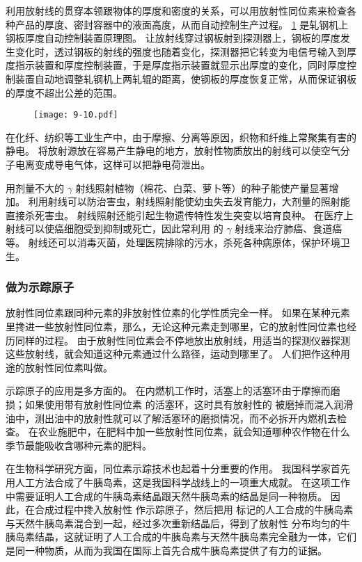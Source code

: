 利用放射线的贯穿本领跟物体的厚度和密度的关系，可以用放射性同位素来检查各种产品的厚度、密封容器中的液面高度，从而自动控制生产过程。
\cref{fig:9-10} 是轧钢机上钢板厚度自动控制装置原理图。
让放射线穿过钢板射到探测器上，钢板的厚度发生变化时，透过钢板的射线的强度也随着变化，探测器把它转变为电信号输入到厚度指示装置和厚度控制装置，于是厚度指示装置就显示出厚度的变化，同时厚度控制装置自动地调整轧钢机上两轧辊的距离，使钢板的厚度恢复正常，从而保证钢板的厚度不超出公差的范围。
\begin{figure}
  \texttt{[image: 9-10.pdf]}
  \caption{}\label{fig:9-10}
\end{figure}

在化纤、纺织等工业生产中，由于摩擦、分离等原因，织物和纤维上常聚集有害的静电。
将放射源放在容易产生静电的地方，放射性物质放出的射线可以使空气分子电离变成导电气体，这样可以把静电荷泄出。

用剂量不大的 $\gamma$ 射线照射植物（棉花、白菜、萝卜等）的种子能使产量显著增加。
利用射线可以防治害虫，射线照射能使幼虫失去发育能力，大剂量的照射能直接杀死害虫。
射线照射还能引起生物遗传特性发生突变以培育良种。
在医疗上射线可以使癌细胞受到抑制或死亡，因此常利用  的 $\gamma$ 射线来治疗肺癌、食道癌等。
射线还可以消毒灭菌，处理医院排除的污水，杀死各种病原体，保护环境卫生。
\subsubsection{做为示踪原子}
放射性同位素跟同种元素的非放射性位素的化学性质完全一样。
如果在某种元素里搀进一些放射性同位素，那么，无论这种元素走到哪里，它的放射性同位素也经历同样的过程。
由于放射性同位素会不停地放出放射线，用适当的探测仪器探测这些放射线，就会知道这种元素通过什么路径，运动到哪里了。
人们把作这种用途的放射性同位素叫做。

示踪原子的应用是多方面的。
在内燃机工作时，活塞上的活塞环由于摩擦而磨损；如果使用带有放射性同位素  的活塞环，这时具有放射性的  被磨掉而混入润滑油中，测出油中的放射性就可以了解活塞环的磨损情况，而不必拆开内燃机去检查。
在农业施肥中，在肥料中加一些放射性同位素，就会知道哪种农作物在什么季节最能吸收含哪种元素的肥料。

在生物科学研究方面，同位素示踪技术也起着十分重要的作用。
我国科学家首先用人工方法合成了牛胰岛素，这是我国科学战线上的一项重大成就。
在这项工作中需要证明人工合成的牛胰岛素结晶跟天然牛胰岛素的结晶是同一种物质。
因此，在合成过程中搀入放射性 作示踪原子，然后把用  标记的人工合成的牛胰岛素与天然牛胰岛素混合到一起，经过多次重新结晶后，得到了放射性  分布均匀的牛胰岛素结晶，这就证明了人工合成的牛胰岛素与天然牛胰岛素完全融为一体，它们是同一种物质，从而为我国在国际上首先合成牛胰岛素提供了有力的证据。

